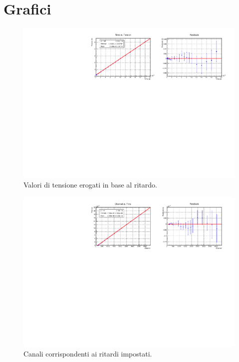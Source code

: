 \section{Grafici}
\vspace{2cm}
\begin{figure}[h]
	\centerline{\includegraphics[scale=1.0]{img/time_tens_437.pdf}}
	\caption{Valori di tensione erogati in base al ritardo.}
	\label{time_tens}
\end{figure}
\begin{figure}[h]
	\centerline{\includegraphics[scale=1.0]{img/chan_time_437.pdf}}
	\caption{Canali corrispondenti ai ritardi impostati.}
	\label{chan_time}
\end{figure}
